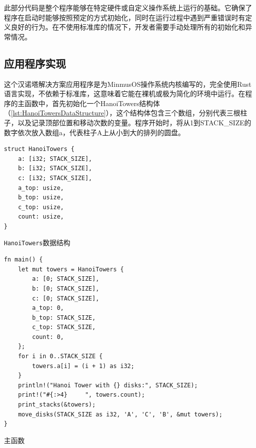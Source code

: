 此部分代码是整个程序能够在特定硬件或自定义操作系统上运行的基础。它确保了程序在启动时能够按照预定的方式初始化，同时在运行过程中遇到严重错误时有定义良好的行为。在不使用标准库的情况下，开发者需要手动处理所有的初始化和异常情况。

\subsection{应用程序实现}

这个汉诺塔解决方案应用程序是为MinmusOS操作系统内核编写的，完全使用Rust语言实现，不依赖于标准库，这意味着它能在裸机或极为简化的环境中运行。在程序的主函数中，首先初始化一个HanoiTowers结构体（\cref{lst:HanoiTowersDataStructure}），这个结构体包含三个数组，分别代表三根柱子，以及记录顶部位置和移动次数的变量。程序开始时，将从1到STACK\_SIZE的数字依次放入数组a，代表柱子A上从小到大的排列的圆盘。

\begin{listing}[htbp]
    \begin{verbatim}
struct HanoiTowers {
    a: [i32; STACK_SIZE],
    b: [i32; STACK_SIZE],
    c: [i32; STACK_SIZE],
    a_top: usize,
    b_top: usize,
    c_top: usize,
    count: usize,
}
    \end{verbatim}
    \caption{\texttt{HanoiTowers}数据结构}\label{lst:HanoiTowersDataStructure}
\end{listing}

\begin{listing}[htbp]
    \begin{verbatim}
fn main() {
    let mut towers = HanoiTowers {
        a: [0; STACK_SIZE],
        b: [0; STACK_SIZE],
        c: [0; STACK_SIZE],
        a_top: 0,
        b_top: STACK_SIZE,
        c_top: STACK_SIZE,
        count: 0,
    };
    for i in 0..STACK_SIZE {
        towers.a[i] = (i + 1) as i32;
    }
    println!("Hanoi Tower with {} disks:", STACK_SIZE);
    print!("#{:>4}     ", towers.count);
    print_stacks(&towers);
    move_disks(STACK_SIZE as i32, 'A', 'C', 'B', &mut towers);
}
    \end{verbatim}
    \caption{主函数}\label{lst:HanoiMainFunction}
\end{listing}

